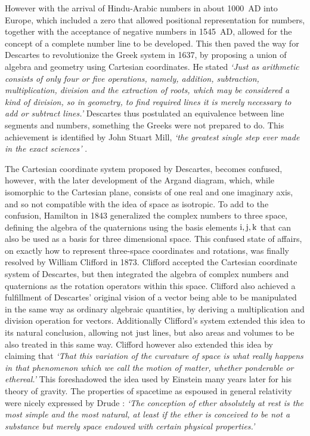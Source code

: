 \documentclass[prb,preprint]{revtex4}
\begin{document}
However with the arrival of Hindu-Arabic numbers in about 1000~AD into Europe, which included a zero that allowed positional representation for numbers, together with the acceptance of negative numbers in 1545~AD, allowed for the concept of a complete number line to be developed.  This then paved the way for Descartes to revolutionize the Greek system in 1637, by proposing a union of algebra and geometry using Cartesian coordinates.  He stated {\it{`Just as arithmetic consists of only four or five operations, namely, addition, subtraction, multiplication, division and the extraction of roots, which may be considered a kind of division, so in geometry, to find required lines it is merely necessary to add or subtract lines.'}}
Descartes thus postulated an equivalence between line segments and numbers, something the Greeks were not prepared to do.  
This achievement is identified by  John Stuart Mill, {\it{`the greatest single step ever made in the exact sciences'}} \cite{StuartMill1979}.

The Cartesian coordinate system proposed by Descartes, becomes confused, however, with the later development of the Argand diagram, which, while isomorphic to the Cartesian plane, consists of one real and one imaginary axis, and so not compatible with the idea of space as isotropic. To add to the confusion, Hamilton in 1843 generalized the complex numbers to three space, defining the algebra of the quaternions using the basis elements $ \rm{i}, \rm{j},\rm{k} $ that can also be used as a basis for three dimensional space.  
This confused state of affairs, on exactly how to represent three-space coordinates and rotations, was finally resolved by William Clifford in 1873.  Clifford accepted the Cartesian coordinate system of Descartes, but then integrated the algebra of complex numbers and quaternions as the rotation operators within this space.  
Clifford also achieved a fulfillment of Descartes' original vision of a vector being able to be manipulated
in the same way as ordinary algebraic quantities, by deriving a multiplication and division operation for vectors.  Additionally Clifford's system extended this idea to its natural conclusion, allowing not just lines, but also areas and volumes to be also treated in this same way. 
Clifford however also extended this idea by claiming that {\it{`That this variation of the curvature of space is what really happens in that phenomenon which we call the motion of matter, whether ponderable or ethereal.'}} \cite{Clifford1876} This foreshadowed the idea used by Einstein many years later for his theory of gravity. The properties of spacetime as espoused in general relativity were nicely expressed by Drude \cite{drude1920}: {\it{`The conception of ether absolutely at rest is the most simple and the most natural, at least if the ether is conceived to be not a substance but merely space endowed with certain physical properties.'}}   
\end{document}
